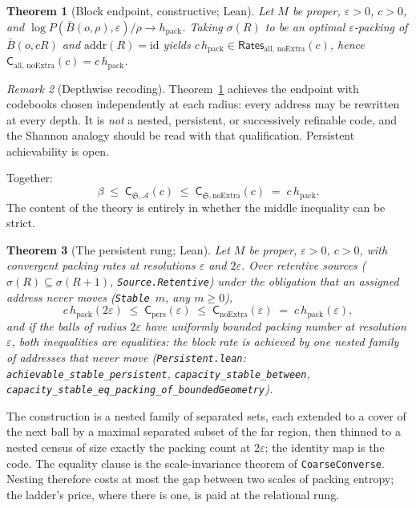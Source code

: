 \documentclass[11pt,a4paper]{article}
\theoremstyle{plain}
\newtheorem{theorem}{Theorem}
\theoremstyle{definition}
\theoremstyle{remark}
\newtheorem{remark}[theorem]{Remark}
\newcommand{\Rates}{\mathsf{Rates}}
\newcommand{\Capy}{\mathsf{C}}
\newcommand{\hpack}{h_{\mathrm{pack}}}
\begin{document}
\begin{theorem}[Block endpoint, constructive; Lean]\label{thm:block}
Let $M$ be proper, $\varepsilon>0$, $c>0$, and
$\log P(\bar B(o,\rho),\varepsilon)/\rho \to \hpack$. Taking
$\sigma(R)$ to be an optimal $\varepsilon$-packing of $\bar B(o,cR)$ and
$\mathrm{addr}(R)=\mathrm{id}$ yields
$c\,\hpack \in \Rates_{\mathrm{all},\,\mathrm{noExtra}}(c)$, hence
$\Capy_{\mathrm{all},\,\mathrm{noExtra}}(c) = c\,\hpack$.
\end{theorem}

\begin{remark}[Depthwise recoding]
Theorem~\ref{thm:block} achieves the endpoint with codebooks chosen
independently at each radius: every address may be rewritten at every depth.
It is \emph{not} a nested, persistent, or successively refinable code, and the
Shannon analogy should be read with that qualification. Persistent
achievability is open.
\end{remark}

Together:
\[
  \beta \;\le\; \Capy_{\mathfrak S,\mathcal A}(c) \;\le\;
  \Capy_{\mathfrak S,\mathrm{noExtra}}(c) \;=\; c\,\hpack .
\]
The content of the theory is entirely in whether the middle inequality can be
strict.

\begin{theorem}[The persistent rung; Lean]\label{thm:persistent}
Let $M$ be proper, $\varepsilon>0$, $c>0$, with convergent packing rates at
resolutions $\varepsilon$ and $2\varepsilon$. Over retentive sources
($\sigma(R)\subseteq\sigma(R{+}1)$, \texttt{Source.Retentive}) under the
obligation that an assigned address never moves (\texttt{Stable}~$m$, any
$m\ge0$),
\[
  c\,\hpack(2\varepsilon)\;\le\;\Capy_{\mathrm{pers}}(\varepsilon)
  \;\le\;\Capy_{\mathrm{noExtra}}(\varepsilon)\;=\;c\,\hpack(\varepsilon),
\]
and if the balls of radius $2\varepsilon$ have uniformly bounded packing number
at resolution $\varepsilon$, both inequalities are equalities: the block rate
is achieved by one nested family of addresses that never move
(\texttt{Persistent.lean}: \texttt{achievable\_stable\_persistent},
\texttt{capacity\_stable\_between},
\texttt{capacity\_stable\_eq\_packing\_of\_boundedGeometry}).
\end{theorem}

The construction is a nested family of separated sets, each extended to a
cover of the next ball by a maximal separated subset of the far region, then
thinned to a nested census of size exactly the packing count at $2\varepsilon$;
the identity map is the code. The equality clause is the scale-invariance
theorem of \texttt{CoarseConverse}. Nesting therefore costs at most the gap
between two scales of packing entropy; the ladder's price, where there is one,
is paid at the relational rung.
\end{document}
